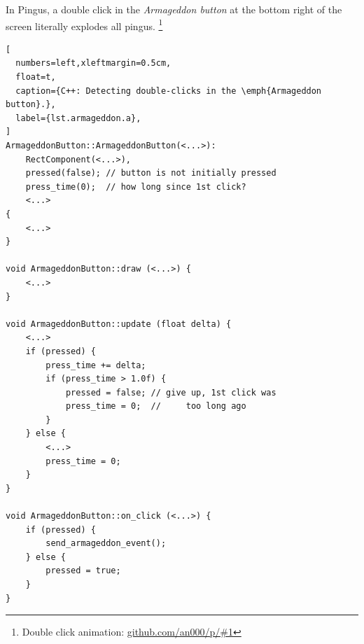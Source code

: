 \documentclass[10pt, conference, compsocconf]{IEEEtran}
\begin{document}
In Pingus, a double click in the \emph{Armageddon button} at the bottom right
of the screen literally explodes all pingus.%
\footnote{Double click animation: \url{github.com/an000/p/#1} }

\begin{lstlisting}[
  numbers=left,xleftmargin=0.5cm,
  float=t,
  caption={C++: Detecting double-clicks in the \emph{Armageddon button}.},
  label={lst.armageddon.a},
]
ArmageddonButton::ArmageddonButton(<...>):
    RectComponent(<...>),
    pressed(false); // button is not initially pressed
    press_time(0);  // how long since 1st click?
    <...>
{
    <...>
}

void ArmageddonButton::draw (<...>) {
    <...>
}

void ArmageddonButton::update (float delta) {
    <...>
    if (pressed) {
        press_time += delta;
        if (press_time > 1.0f) {
            pressed = false; // give up, 1st click was
            press_time = 0;  //     too long ago
        }
    } else {
        <...>
        press_time = 0;
    }
}

void ArmageddonButton::on_click (<...>) {
    if (pressed) {
        send_armageddon_event();
    } else {
        pressed = true;
    }
}
\end{lstlisting}
\end{document}
